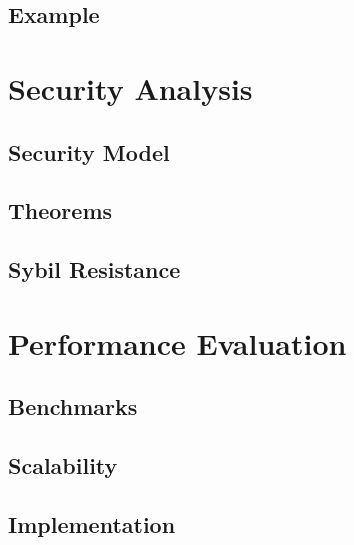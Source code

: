 \subsection{Example}

\section{Security Analysis}
\subsection{Security Model}

\subsection{Theorems}

\subsection{Sybil Resistance}

\section{Performance Evaluation}
\subsection{Benchmarks}

\subsection{Scalability}

\subsection{Implementation}





























